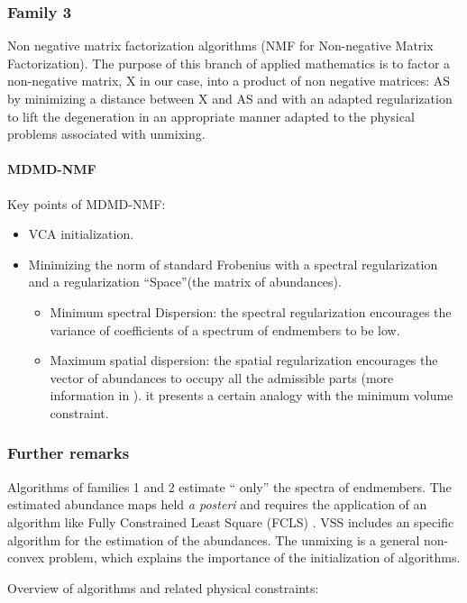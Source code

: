 \subsubsection{Family 3}
Non negative matrix factorization algorithms (NMF for Non-negative Matrix Factorization). The purpose of this
branch of applied mathematics is to factor a non-negative matrix, X in our case, into a product of non negative matrices: AS by minimizing a distance between X and AS and
with an adapted regularization to lift the degeneration in an appropriate manner adapted to the physical problems associated with unmixing.

\paragraph{MDMD-NMF \cite{Huck2010b}} 
Key points of MDMD-NMF:
\begin{itemize}
\item {VCA initialization.}
\item {Minimizing the norm of standard
Frobenius with a spectral regularization and a regularization ``Space''(the matrix of abundances).}
\begin{itemize}
\item {Minimum spectral
Dispersion: the spectral regularization encourages the  variance of 
coefficients of a spectrum of endmembers to be low.}
\item {Maximum spatial dispersion: the spatial regularization
  encourages the vector of abundances to occupy all the admissible parts (more information in \cite{Huck2009}). it
  presents a certain analogy with the minimum volume constraint.}
\end{itemize}
\end{itemize}
 
 
  

\subsubsection{Further remarks}
Algorithms of families 1 and 2 estimate `` only'' the spectra of
endmembers. The estimated abundance maps held
\textit{a posteri} and requires the application of an algorithm like Fully
Constrained Least Square (FCLS) \cite{Heinz2001}. VSS includes an specific algorithm
for the estimation of the abundances.
The unmixing is a general non-convex problem,
which explains the importance of the initialization of algorithms.

Overview of algorithms and related physical constraints:

